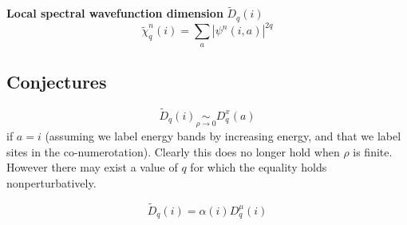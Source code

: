 \documentclass[11pt]{article}
\newcommand{\simlim}[2]{\ensuremath{ \underset{#1 \rightarrow #2}{\sim} }}
\begin{document}
\textbf{Local spectral wavefunction dimension} $\boxed{\tilde D_q(i)}$
\begin{equation}
	\tilde \chi^n_q(i) = \sum_a|\psi^n(i,a)|^{2q}
\end{equation}

\subsection{Conjectures}
\begin{equation}
	\tilde{D}_q(i)  \simlim{\rho}{0} D^x_q(a)
\end{equation}
if $a=i$ (assuming we label energy bands by increasing energy, and that we label sites in the co-numerotation).
Clearly this does no longer hold when $\rho$ is finite.
However there may exist a value of $q$ for which the equality holds nonperturbatively.

\begin{equation}
	\tilde{D}_q(i) = \alpha(i) D^\mu_q(i)
\end{equation}
{}

\end{document}
